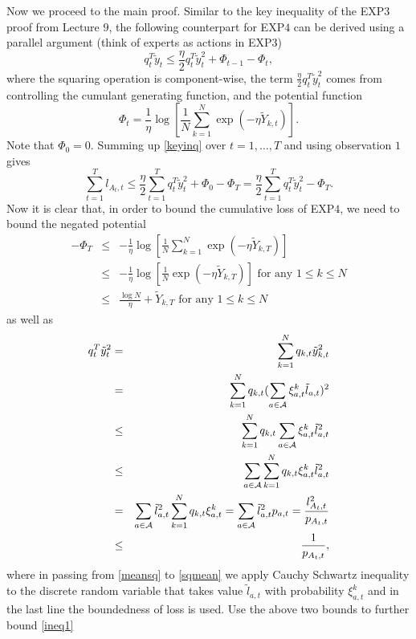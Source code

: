 \documentclass[11pt]{article}
\begin{document}
Now we proceed to the main proof. Similar to the key inequality of the EXP$3$ proof from Lecture $9$, the following counterpart for EXP$4$ can be derived using a parallel argument (think of experts as actions in EXP$3$)
\begin{equation}\label{keyinq}
q_t^T\tilde{y}_t\leq \frac{\eta}{2}q_t^T\tilde{y}_t^2+\Phi_{t-1}-\Phi_t,
\end{equation}
where the squaring operation is component-wise, the term $\frac{\eta}{2}q_t^T\tilde{y}_t^2$ comes from controlling the cumulant generating function, and the potential function
\begin{equation*}
\Phi_t=\frac{1}{\eta}\log [\frac{1}{N}\sum_{k=1}^N\exp(-\eta\tilde{Y}_{k,t})].
\end{equation*}
Note that $\Phi_0=0$. Summing up \eqref{keyinq} over $t=1,\ldots,T$ and using observation $1$ gives
\begin{equation}\label{ineq1}
\sum_{t=1}^Tl_{A_t,t}\leq \frac{\eta}{2}\sum_{t=1}^Tq_t^T\tilde{y}_t^2+\Phi_0-\Phi_T=\frac{\eta}{2}\sum_{t=1}^Tq_t^T\tilde{y}_t^2-\Phi_T.
\end{equation}
Now it is clear that, in order to bound the cumulative loss of EXP$4$, we need to bound the negated potential
\begin{eqnarray*}
-\Phi_T&\leq&-\frac{1}{\eta}\log [\frac{1}{N}\sum_{k=1}^N\exp(-\eta\tilde{Y}_{k,T})]\\
&\leq&-\frac{1}{\eta}\log [\frac{1}{N}\exp(-\eta\tilde{Y}_{k,T})]\text{ for any }1\leq k\leq N\\
&\leq&\frac{\log N}{\eta}+\tilde{Y}_{k,T}\text{ for any }1\leq k\leq N
\end{eqnarray*}
as well as
\begin{eqnarray}
\nonumber q_t^T\tilde{y}_{t}^2&=&\sum_{k=1}^Nq_{k,t}\tilde{y}_{k,t}^2\\
\nonumber&=&\sum_{k=1}^Nq_{k,t}(\sum_{a\in \mathcal{A}}\xi_{a,t}^k\tilde{l}_{a,t})^2\\
&\leq&\sum_{k=1}^Nq_{k,t}\sum_{a\in \mathcal{A}}\xi_{a,t}^k\tilde{l}_{a,t}^2\label{meansq} \\
&\leq&\sum_{a\in \mathcal{A}}\sum_{k=1}^Nq_{k,t}\xi_{a,t}^k\tilde{l}_{a,t}^2\label{sqmean} \\
\nonumber&=&\sum_{a\in \mathcal{A}}\tilde{l}_{a,t}^2\sum_{k=1}^Nq_{k,t}\xi_{a,t}^k=\sum_{a\in \mathcal{A}}\tilde{l}_{a,t}^2p_{a,t}=\frac{l_{A_t,t}^2}{p_{A_t,t}}\\
\nonumber&\leq&\frac{1}{p_{A_t,t}},
\end{eqnarray}
where in passing from \eqref{meansq} to \eqref{sqmean} we apply Cauchy Schwartz inequality to the discrete random variable that takes value $\tilde{l}_{a,t}$ with probability $\xi_{a,t}^k$ and in the last line the boundedness of loss is used. Use the above two bounds to further bound \eqref{ineq1}
\end{document}
